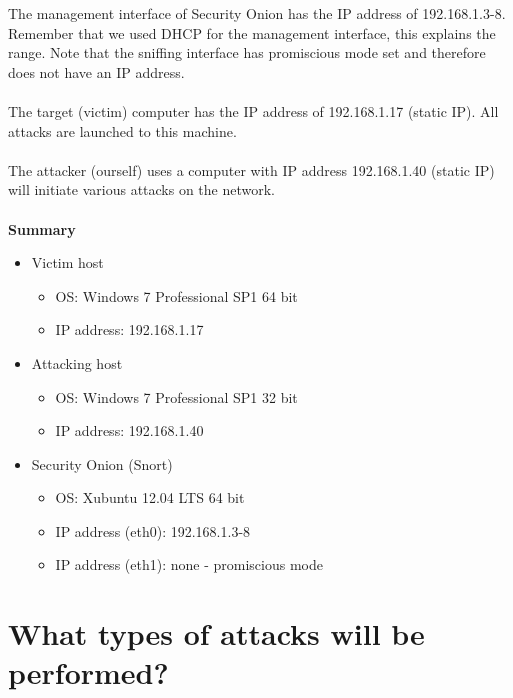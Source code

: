 The management interface of Security Onion has the IP address of 192.168.1.3-8. Remember that we used DHCP for the management interface, this explains the range. Note that the sniffing interface has promiscious mode set and therefore does not have an IP address. \\ \\
The target (victim) computer has the IP address of 192.168.1.17 (static IP). All attacks are launched to this machine. \\ \\
The attacker (ourself) uses a computer with IP address 192.168.1.40 (static IP) will initiate various attacks on the network. \\ \\
\textbf{Summary}
\begin{itemize}
\item Victim host
	\begin{itemize}
	\item OS: Windows 7 Professional SP1 64 bit
	\item IP address: 192.168.1.17
	\end{itemize}
\item Attacking host
	\begin{itemize}
	\item OS: Windows 7 Professional SP1 32 bit
	\item IP address: 192.168.1.40
	\end{itemize}
\item Security Onion (Snort)
	\begin{itemize}
	\item OS: Xubuntu 12.04 LTS 64 bit
	\item IP address (eth0): 192.168.1.3-8
	\item IP address (eth1): none - promiscious mode
	\end{itemize}
\end{itemize}

\section{What types of attacks will be performed?}

